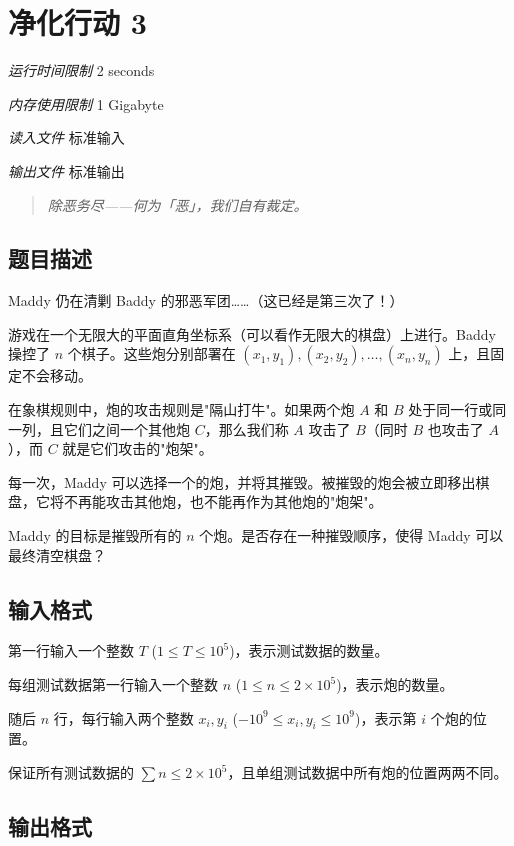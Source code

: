 \section[L. 净化行动 3]{ 净化行动 3}

\textit{运行时间限制}   2 seconds

\textit{内存使用限制} 1 Gigabyte

\textit{读入文件} \qquad 标准输入

\textit{输出文件} \qquad 标准输出


\begin{quote}
	\textit{除恶务尽——何为「恶」，我们自有裁定。}
\end{quote}

\subsection{题目描述}

Maddy 仍在清剿 Baddy 的邪恶军团……（这已经是第三次了！）

游戏在一个无限大的平面直角坐标系（可以看作无限大的棋盘）上进行。Baddy 操控了 $n$ 个棋子。这些炮分别部署在 $(x_1, y_1), (x_2, y_2), \ldots, (x_n, y_n)$ 上，且固定不会移动。

在象棋规则中，炮的攻击规则是"隔山打牛"。如果两个炮 $A$ 和 $B$ 处于同一行或同一列，且它们之间一个其他炮 $C$，那么我们称 $A$ 攻击了 $B$（同时 $B$ 也攻击了 $A$），而 $C$ 就是它们攻击的"炮架"。

每一次，Maddy 可以选择一个的炮，并将其摧毁。被摧毁的炮会被立即移出棋盘，它将不再能攻击其他炮，也不能再作为其他炮的"炮架"。

Maddy 的目标是摧毁所有的 $n$ 个炮。是否存在一种摧毁顺序，使得 Maddy 可以最终清空棋盘？

\subsection{输入格式}

第一行输入一个整数 $T$ ($1 \le T \le 10^5$)，表示测试数据的数量。

每组测试数据第一行输入一个整数 $n$ ($1 \le n \le 2 \times 10^5$)，表示炮的数量。

随后 $n$ 行，每行输入两个整数 $x_i, y_i$ ($-10^9 \le x_i, y_i \le 10^9$)，表示第 $i$ 个炮的位置。

保证所有测试数据的 $\sum n \le 2 \times 10^5$，且单组测试数据中所有炮的位置两两不同。

\subsection{输出格式}

